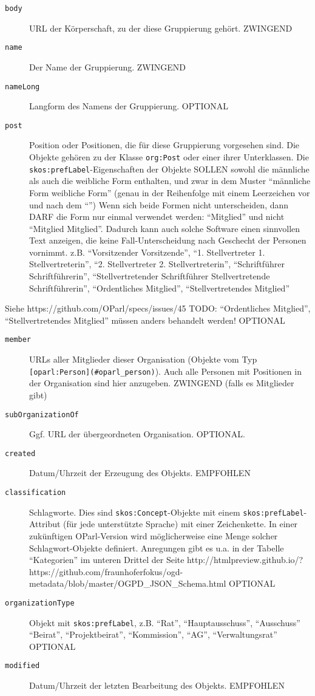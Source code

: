 \documentclass[,a4paper]{article}
\begin{document}
\begin{description}
\item[\texttt{body}]
URL der Körperschaft, zu der diese Gruppierung gehört. ZWINGEND
\item[\texttt{name}]
Der Name der Gruppierung. ZWINGEND
\item[\texttt{nameLong}]
Langform des Namens der Gruppierung. OPTIONAL
\item[\texttt{post}]
Position oder Positionen, die für diese Gruppierung vorgesehen sind. Die
Objekte gehören zu der Klasse \texttt{org:Post} oder einer ihrer
Unterklassen. Die \texttt{skos:prefLabel}-Eigenschaften der Objekte
SOLLEN sowohl die männliche als auch die weibliche Form enthalten, und
zwar in dem Muster ``männliche Form \textbar{} weibliche Form'' (genau
in der Reihenfolge mit einem Leerzeichen vor und nach dem
``\textbar{}'') Wenn sich beide Formen nicht unterscheiden, dann DARF
die Form nur einmal verwendet werden: ``Mitglied'' und nicht ``Mitglied
\textbar{} Mitglied''. Dadurch kann auch solche Software einen
sinnvollen Text anzeigen, die keine Fall-Unterscheidung nach Geschecht
der Personen vornimmt. z.B. ``Vorsitzender \textbar{} Vorsitzende'',
``1. Stellvertreter \textbar{} 1. Stellvertreterin'', ``2.
Stellvertreter \textbar{} 2. Stellvertreterin'', ``Schriftführer
\textbar{} Schriftführerin'', ``Stellvertretender Schriftführer
\textbar{} Stellvertretende Schriftführerin'', ``Ordentliches
Mitglied'', ``Stellvertretendes Mitglied''
\end{description}

Siehe https://github.com/OParl/specs/issues/45 TODO: ``Ordentliches
Mitglied'', ``Stellvertretendes Mitglied'' müssen anders behandelt
werden! OPTIONAL

\begin{description}
\item[\texttt{member}]
URLs aller Mitglieder dieser Organisation (Objekte vom Typ
\texttt{{[}oparl:Person{]}(\#oparl\_person)}). Auch alle Personen mit
Positionen in der Organisation sind hier anzugeben. ZWINGEND (falls es
Mitglieder gibt)
\item[\texttt{subOrganizationOf}]
Ggf. URL der übergeordneten Organisation. OPTIONAL.
\item[\texttt{created}]
Datum/Uhrzeit der Erzeugung des Objekts. EMPFOHLEN
\item[\texttt{classification}]
Schlagworte. Dies sind \texttt{skos:Concept}-Objekte mit einem
\texttt{skos:prefLabel}-Attribut (für jede unterstützte Sprache) mit
einer Zeichenkette. In einer zukünftigen OParl-Version wird
möglicherweise eine Menge solcher Schlagwort-Objekte definiert.
Anregungen gibt es u.a. in der Tabelle ``Kategorien'' im unteren Drittel
der Seite
http://htmlpreview.github.io/?https://github.com/fraunhoferfokus/ogd-metadata/blob/master/OGPD\_JSON\_Schema.html
OPTIONAL
\item[\texttt{organizationType}]
Objekt mit \texttt{skos:prefLabel}, z.B. ``Rat'', ``Hauptausschuss'',
``Ausschuss'' ``Beirat'', ``Projektbeirat'', ``Kommission'', ``AG'',
``Verwaltungsrat'' OPTIONAL
\item[\texttt{modified}]
Datum/Uhrzeit der letzten Bearbeitung des Objekts. EMPFOHLEN
\end{description}
\end{document}
